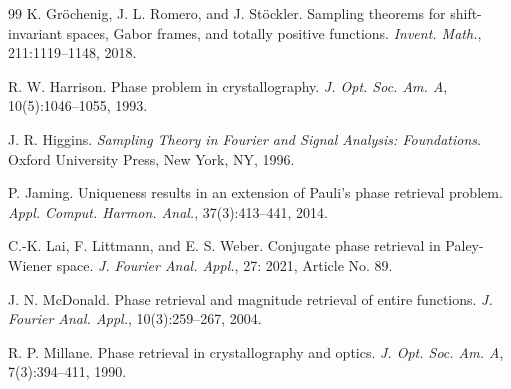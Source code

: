 \documentclass[12pt,oneside,reqno]{amsart}
\numberwithin{equation}{section}
\begin{document}
\begin{thebibliography}{99}
	K. Gr{\"o}chenig, J. L. Romero, and J. St{\"o}ckler. Sampling theorems for shift-invariant spaces, Gabor frames, and totally positive functions. \emph{Invent. Math.}, 211:1119--1148, 2018.
	
	
	
	R. W. Harrison. Phase problem in crystallography. \emph{J. Opt. Soc. Am. A}, 10(5):1046--1055, 1993.
	
	J. R. Higgins. \emph{Sampling Theory in Fourier and Signal Analysis: Foundations}. Oxford University Press, New York, NY, 1996.
	
	
	P. Jaming. Uniqueness results in an extension of Pauli's phase retrieval problem. \emph{Appl. Comput. Harmon. Anal.}, 37(3):413--441, 2014.
	
	C.-K. Lai, F. Littmann, and E. S. Weber. Conjugate phase retrieval in Paley-Wiener space. \emph{J. Fourier Anal. Appl.}, 27: 2021, Article No. 89.
	
	
	
	J. N. McDonald. Phase retrieval and magnitude retrieval of entire functions. \emph{J. Fourier Anal. Appl.}, 10(3):259--267, 2004.
	
	R. P. Millane. Phase retrieval in crystallography and optics. \emph{J. Opt. Soc. Am. A}, 7(3):394--411, 1990.
	

\end{thebibliography}
\end{document}
